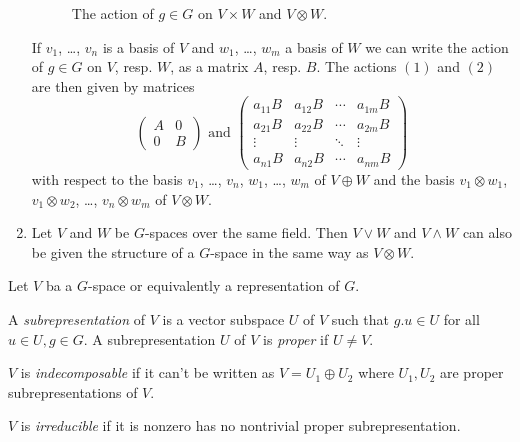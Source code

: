 \begin{expls}
\begin{enumerate}[label=\emph{\alph*)},leftmargin=*]
   \begin{figure}\label{fig: action on product and tensor}\centering
    \caption{The action of $g \in G$ on $V \times W$ and $V \otimes W$.}
   \end{figure}
   If $v_1$, \dots, $v_n$ is a basis of $V$ and $w_1$, \dots, $w_m$ a basis of $W$ we can write the action of $g \in G$ on $V$, resp. $W$, as a matrix $A$, resp. $B$. The actions $(1)$ and $(2)$ are then given by matrices
   \[
    \begin{pmatrix}
     A & 0 \\
     0 & B
    \end{pmatrix}
    \text{ and }
    \begin{pmatrix}
     a_{11} B & a_{12} B & \cdots & a_{1m} B \\
     a_{21} B & a_{22} B & \cdots & a_{2m} B \\
      \vdots  &  \vdots  & \ddots &  \vdots  \\
     a_{n1} B & a_{n2} B & \cdots & a_{nm} B
    \end{pmatrix}
   \]
   with respect to the basis $v_1$, \dots, $v_n$, $w_1$, \dots, $w_m$ of $V \oplus W$ and the basis $v_1 \otimes w_1$, $v_1 \otimes w_2$, \dots, $v_n \otimes w_m$ of $V \otimes W$.
  \item
   Let $V$ and $W$ be $G$-spaces over the same field. Then $V \vee W$ and $V \wedge W$ can also be given the structure of a $G$-space in the same way as $V \otimes W$.
 \end{enumerate}
\end{expls}


\begin{defi}
  Let $V$ ba a $G$-space or equivalently a representation of $G$.

  A \emph{subrepresentation} of $V$ is a vector subspace $U$ of $V$ such that $g.u \in U$ for all $u \in U, g \in G$. A subrepresentation $U$ of $V$ is \emph{proper} if $U \neq V$.
  
  $V$ is \emph{indecomposable} if it can’t be written as $V = U_1 \oplus U_2$ where $U_1, U_2$ are proper subrepresentations of $V$.
  
  $V$ is \emph{irreducible} if it is nonzero has no nontrivial proper subrepresentation.
\end{defi}

